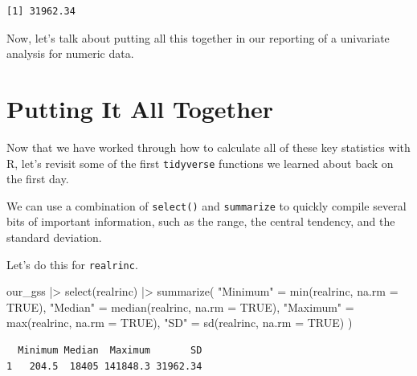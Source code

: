 \documentclass[
  letterpaper,
  DIV=11,
  numbers=noendperiod]{scrreprt}
\newenvironment{Shaded}{\begin{snugshade}}{\end{snugshade}}
\newcommand{\AttributeTok}[1]{\textcolor[rgb]{0.40,0.45,0.13}{#1}}
\newcommand{\ConstantTok}[1]{\textcolor[rgb]{0.56,0.35,0.01}{#1}}
\newcommand{\FunctionTok}[1]{\textcolor[rgb]{0.28,0.35,0.67}{#1}}
\newcommand{\NormalTok}[1]{\textcolor[rgb]{0.00,0.23,0.31}{#1}}
\newcommand{\OtherTok}[1]{\textcolor[rgb]{0.00,0.23,0.31}{#1}}
\newcommand{\SpecialCharTok}[1]{\textcolor[rgb]{0.37,0.37,0.37}{#1}}
\newcommand{\StringTok}[1]{\textcolor[rgb]{0.13,0.47,0.30}{#1}}
\begin{document}
\begin{verbatim}
[1] 31962.34
\end{verbatim}

Now, let's talk about putting all this together in our reporting of a
univariate analysis for numeric data.

\section{Putting It All Together}\label{putting-it-all-together-1}

Now that we have worked through how to calculate all of these key
statistics with R, let's revisit some of the first \texttt{tidyverse}
functions we learned about back on the first day.

We can use a combination of \texttt{select()} and \texttt{summarize} to
quickly compile several bits of important information, such as the
range, the central tendency, and the standard deviation.

Let's do this for \texttt{realrinc}.

\begin{Shaded}
\begin{Highlighting}[]
\NormalTok{our\_gss }\SpecialCharTok{|\textgreater{}}
  \FunctionTok{select}\NormalTok{(realrinc) }\SpecialCharTok{|\textgreater{}}
  \FunctionTok{summarize}\NormalTok{(}
    \StringTok{"Minimum"} \OtherTok{=} \FunctionTok{min}\NormalTok{(realrinc, }\AttributeTok{na.rm =} \ConstantTok{TRUE}\NormalTok{),}
    \StringTok{"Median"} \OtherTok{=} \FunctionTok{median}\NormalTok{(realrinc, }\AttributeTok{na.rm =} \ConstantTok{TRUE}\NormalTok{),}
    \StringTok{"Maximum"} \OtherTok{=} \FunctionTok{max}\NormalTok{(realrinc, }\AttributeTok{na.rm =} \ConstantTok{TRUE}\NormalTok{),}
    \StringTok{"SD"} \OtherTok{=} \FunctionTok{sd}\NormalTok{(realrinc, }\AttributeTok{na.rm =} \ConstantTok{TRUE}\NormalTok{)}
\NormalTok{  )}
\end{Highlighting}
\end{Shaded}

\begin{verbatim}
  Minimum Median  Maximum       SD
1   204.5  18405 141848.3 31962.34
\end{verbatim}
\end{document}

